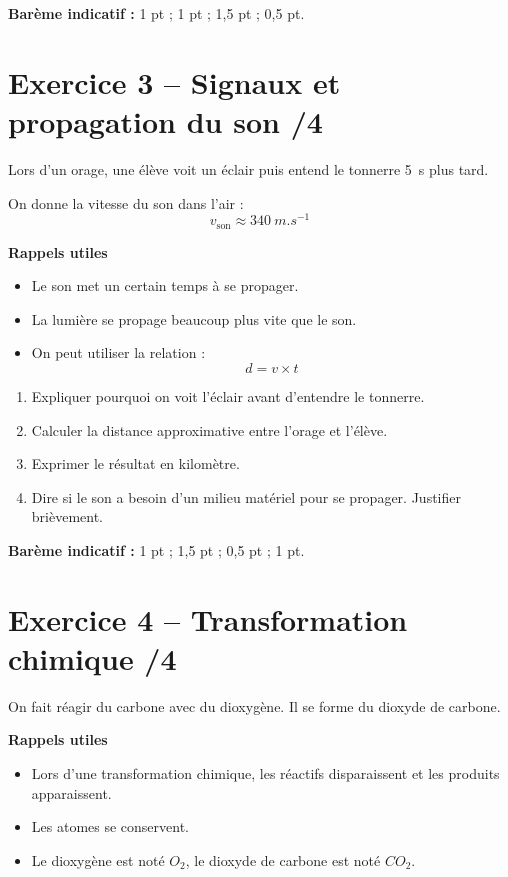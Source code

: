 \documentclass[11pt,a4paper]{article}
\begin{document}
\textbf{Barème indicatif :} 1 pt ; 1 pt ; 1,5 pt ; 0,5 pt.

\section*{Exercice 3 -- Signaux et propagation du son \hfill /4}

Lors d’un orage, une élève voit un éclair puis entend le tonnerre \SI{5}{s} plus tard.

On donne la vitesse du son dans l’air :
\[
v_{\text{son}} \approx \SI{340}{m.s^{-1}}
\]

\textbf{Rappels utiles}
\begin{itemize}[leftmargin=1.2cm]
    \item Le son met un certain temps à se propager.
    \item La lumière se propage beaucoup plus vite que le son.
    \item On peut utiliser la relation :
    \[
    d=v\times t
    \]
\end{itemize}

\begin{enumerate}
    \item Expliquer pourquoi on voit l’éclair avant d’entendre le tonnerre.
    \item Calculer la distance approximative entre l’orage et l’élève.
    \item Exprimer le résultat en kilomètre.
    \item Dire si le son a besoin d’un milieu matériel pour se propager. Justifier brièvement.
\end{enumerate}

\textbf{Barème indicatif :} 1 pt ; 1,5 pt ; 0,5 pt ; 1 pt.

\section*{Exercice 4 -- Transformation chimique \hfill /4}

On fait réagir du carbone avec du dioxygène. Il se forme du dioxyde de carbone.

\textbf{Rappels utiles}
\begin{itemize}[leftmargin=1.2cm]
    \item Lors d’une transformation chimique, les réactifs disparaissent et les produits apparaissent.
    \item Les atomes se conservent.
    \item Le dioxygène est noté \(O_2\), le dioxyde de carbone est noté \(CO_2\).
\end{itemize}
\end{document}
